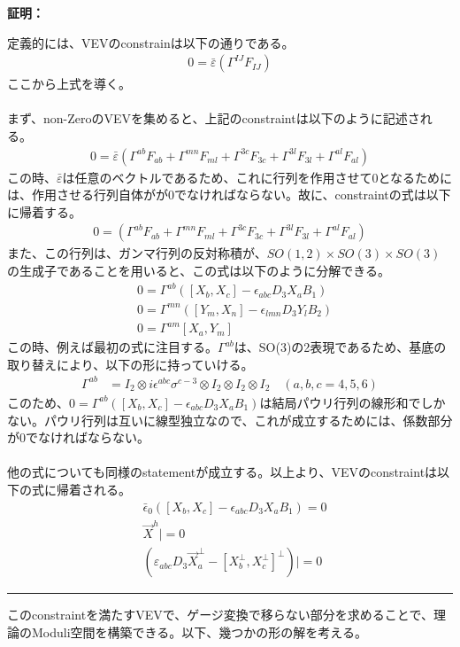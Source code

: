 \documentclass[dvipdfmx,a4paper,10.5pt]{article}
\numberwithin{equation}{section}
\newenvironment{proofbox}
{\begin{prooflabel}\textbf{証明：}\end{prooflabel}\vspace{0.8em}}
{\par\vspace{1em}\hrule\vspace{1em}}
\begin{document}
\begin{proofbox}
    定義的には、VEVのconstrainは以下の通りである。
    \begin{align*}
        0=\bar{\varepsilon}(\Gamma^{IJ}F_{IJ})
    \end{align*}
    ここから上式を導く。\\
    \\
    まず、non-ZeroのVEVを集めると、上記のconstraintは以下のように記述される。
    \begin{align*}
        0=\bar{\varepsilon}(\Gamma^{ab}F_{ab}+\Gamma^{mn}F_{ml}+\Gamma^{3c}F_{3c}+\Gamma^{3l}F_{3l}+\Gamma^{al}F_{al})
    \end{align*}
    この時、$\bar{\varepsilon}$は任意のベクトルであるため、これに行列を作用させて0となるためには、作用させる行列自体がが0でなければならない。故に、constraintの式は以下に帰着する。
    \begin{align*}
        0=(\Gamma^{ab}F_{ab}+\Gamma^{mn}F_{ml}+\Gamma^{3c}F_{3c}+\Gamma^{3l}F_{3l}+\Gamma^{al}F_{al})
    \end{align*}
    また、この行列は、ガンマ行列の反対称積が、$SO(1,2)\times SO(3)\times SO(3)$の生成子であることを用いると、この式は以下のように分解できる。
    \begin{align*}
        &0=\Gamma^{ab}([X_{b},X_{c}]-\epsilon_{abc}D_{3}X_{a}B_{1})\\
        &0=\Gamma^{mn}([Y_{
        m},X_{n}]-\epsilon_{lmn}D_{3}Y_{l}B_{2})\\
        &0=\Gamma^{am}[X_{a},Y_{m}]
    \end{align*}
    この時、例えば最初の式に注目する。$\Gamma^{ab}$は、SO(3)の2表現であるため、基底の取り替えにより、以下の形に持っていける。
    \begin{align*}
        \Gamma^{ab}&=I_{2}\otimes i \epsilon^{abc}\sigma^{c-3}\otimes I_{2}\otimes I_{2}\otimes I_{2}\quad(a,b,c=4,5,6)
    \end{align*}
    このため、$0=\Gamma^{ab}([X_{b},X_{c}]-\epsilon_{abc}D_{3}X_{a}B_{1})$は結局パウリ行列の線形和でしかない。パウリ行列は互いに線型独立なので、これが成立するためには、係数部分が0でなければならない。\\
    \\
    他の式についても同様のstatementが成立する。以上より、VEVのconstraintは以下の式に帰着される。
     \begin{align*}
    &\bar{\epsilon}_{0}([X_{b},X_{c}]-\epsilon_{abc}D_{3}X_{a}B_{1})=0\\
    &\vec{X}^{h}|=0\\
    &(\varepsilon_{abc}D_{3}\vec{X}_{a}^{\perp}-[X_{b}^{\perp},X_{c}^{\perp}]^{\perp})|=0
    \end{align*}
\end{proofbox}
このconstraintを満たすVEVで、ゲージ変換で移らない部分を求めることで、理論のModuli空間を構築できる。以下、幾つかの形の解を考える。
\end{document}
